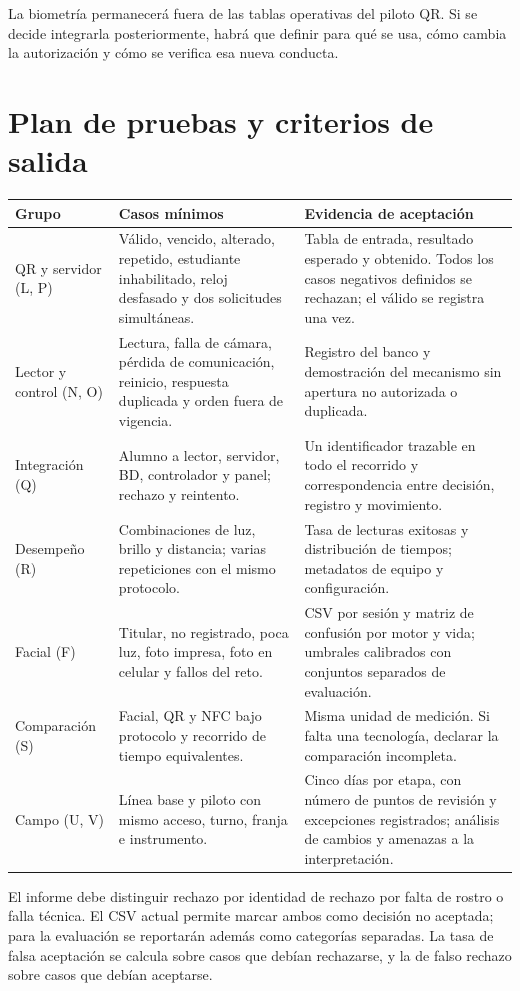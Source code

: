 \documentclass[11pt,letterpaper]{article}
\newcommand{\pagina}[1]{\clearpage\section{#1}}
\begin{document}
La biometría permanecerá fuera de las tablas operativas del piloto QR. Si se decide integrarla posteriormente, habrá que definir para qué se usa, cómo cambia la autorización y cómo se verifica esa nueva conducta.

\pagina{Plan de pruebas y criterios de salida}
\begin{longtable}{P{2.8cm}P{6.1cm}P{5.9cm}}
\toprule Grupo & Casos mínimos & Evidencia de aceptación \\ \midrule
\endhead
QR y servidor (L, P) & Válido, vencido, alterado, repetido, estudiante inhabilitado, reloj desfasado y dos solicitudes simultáneas. & Tabla de entrada, resultado esperado y obtenido. Todos los casos negativos definidos se rechazan; el válido se registra una vez. \\[0.4em]
Lector y control (N, O) & Lectura, falla de cámara, pérdida de comunicación, reinicio, respuesta duplicada y orden fuera de vigencia. & Registro del banco y demostración del mecanismo sin apertura no autorizada o duplicada. \\[0.4em]
Integración (Q) & Alumno a lector, servidor, BD, controlador y panel; rechazo y reintento. & Un identificador trazable en todo el recorrido y correspondencia entre decisión, registro y movimiento. \\[0.4em]
Desempeño (R) & Combinaciones de luz, brillo y distancia; varias repeticiones con el mismo protocolo. & Tasa de lecturas exitosas y distribución de tiempos; metadatos de equipo y configuración. \\[0.4em]
Facial (F) & Titular, no registrado, poca luz, foto impresa, foto en celular y fallos del reto. & CSV por sesión y matriz de confusión por motor y vida; umbrales calibrados con conjuntos separados de evaluación. \\[0.4em]
Comparación (S) & Facial, QR y NFC bajo protocolo y recorrido de tiempo equivalentes. & Misma unidad de medición. Si falta una tecnología, declarar la comparación incompleta. \\[0.4em]
Campo (U, V) & Línea base y piloto con mismo acceso, turno, franja e instrumento. & Cinco días por etapa, con número de puntos de revisión y excepciones registrados; análisis de cambios y amenazas a la interpretación. \\ \bottomrule
\end{longtable}

El informe debe distinguir rechazo por identidad de rechazo por falta de rostro o falla técnica. El CSV actual permite marcar ambos como decisión no aceptada; para la evaluación se reportarán además como categorías separadas. La tasa de falsa aceptación se calcula sobre casos que debían rechazarse, y la de falso rechazo sobre casos que debían aceptarse.
\end{document}
